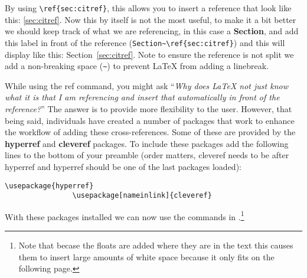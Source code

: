 			By using \lstinline|\ref{sec:citref}|, this allows you to insert a reference that look like this: \ref{sec:citref}.
			Now this by itself is not the most useful, to make it a bit better we should keep track of what we are referencing, in this case a \textbf{Section}, and add this label in front of the reference (\lstinline|Section~\ref{sec:citref}|) and this will display like this: Section~\ref{sec:citref}.
			Note to ensure the reference is not split we add a non-breaking space (\lstinline|~|) to prevent \LaTeX{} from adding a linebreak.

			While using the ref command, you might ask \enquote{\textit{Why does \LaTeX{} not just know what it is that I am referencing and insert that automatically in front of the reference?}}
			The answer is to provide more flexibility to the user.
			However, that being said, individuals have created a number of packages that work to enhance the workflow of adding these cross-references.
			Some of these are provided by the \textbf{hyperref} and \textbf{cleveref} packages.
			To include these packages add the following lines to the bottom of your preamble (order matters, cleveref needs to be after hyperref and hyperref should be one of the last packages loaded):
			\begin{lstlisting}[style=LaTeXStyle]
				\usepackage{hyperref}
				\usepackage[nameinlink]{cleveref}
			\end{lstlisting}
			With these packages installed we can now use the commands in .\footnote{Note that becase the floats are added where they are in the text this causes them to insert large amounts of white space because it only fits on the following page.}

